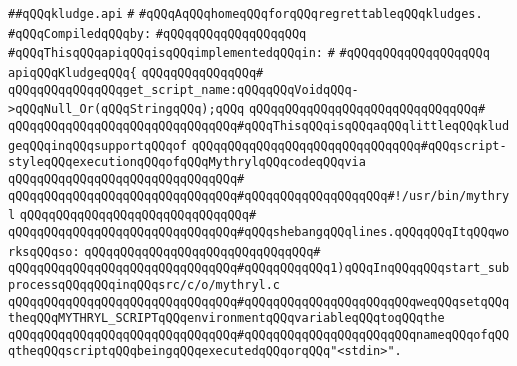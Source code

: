 \label{src/lib/src/kludge.api}
\verb|##qQQqkludge.api|\newline
\verb|#|\newline
\verb|#qQQqAqQQqhomeqQQqforqQQqregrettableqQQqkludges.|\newline
\newline
\verb|#qQQqCompiledqQQqby:|\newline
\verb|#qQQqqQQqqQQqqQQqqQQq|\newline
\newline
\verb|#qQQqThisqQQqapiqQQqisqQQqimplementedqQQqin:|\newline
\verb|#|\newline
\verb|#qQQqqQQqqQQqqQQqqQQq|\newline
\newline
\verb|apiqQQqKludgeqQQq{|\newline
\verb|qQQqqQQqqQQqqQQq#|\newline
\verb|qQQqqQQqqQQqqQQqget_script_name:qQQqqQQqVoidqQQq->qQQqNull_Or(qQQqStringqQQq);qQQq|\newline
\verb|qQQqqQQqqQQqqQQqqQQqqQQqqQQqqQQq#|\newline
\verb|qQQqqQQqqQQqqQQqqQQqqQQqqQQqqQQq#qQQqThisqQQqisqQQqaqQQqlittleqQQqkludgeqQQqinqQQqsupportqQQqof|\newline
\verb|qQQqqQQqqQQqqQQqqQQqqQQqqQQqqQQq#qQQqscript-styleqQQqexecutionqQQqofqQQqMythrylqQQqcodeqQQqvia|\newline
\verb|qQQqqQQqqQQqqQQqqQQqqQQqqQQqqQQq#|\newline
\verb|qQQqqQQqqQQqqQQqqQQqqQQqqQQqqQQq#qQQqqQQqqQQqqQQqqQQq#!/usr/bin/mythryl|\newline
\verb|qQQqqQQqqQQqqQQqqQQqqQQqqQQqqQQq#|\newline
\verb|qQQqqQQqqQQqqQQqqQQqqQQqqQQqqQQq#qQQqshebangqQQqlines.qQQqqQQqItqQQqworksqQQqso:|\newline
\verb|qQQqqQQqqQQqqQQqqQQqqQQqqQQqqQQq#|\newline
\verb|qQQqqQQqqQQqqQQqqQQqqQQqqQQqqQQq#qQQqqQQqqQQq1)qQQqInqQQqqQQqstart_subprocessqQQqqQQqinqQQqsrc/c/o/mythryl.c|\newline
\verb|qQQqqQQqqQQqqQQqqQQqqQQqqQQqqQQq#qQQqqQQqqQQqqQQqqQQqqQQqweqQQqsetqQQqtheqQQqMYTHRYL_SCRIPTqQQqenvironmentqQQqvariableqQQqtoqQQqthe|\newline
\verb|qQQqqQQqqQQqqQQqqQQqqQQqqQQqqQQq#qQQqqQQqqQQqqQQqqQQqqQQqnameqQQqofqQQqtheqQQqscriptqQQqbeingqQQqexecutedqQQqorqQQq"<stdin>".|\newline
